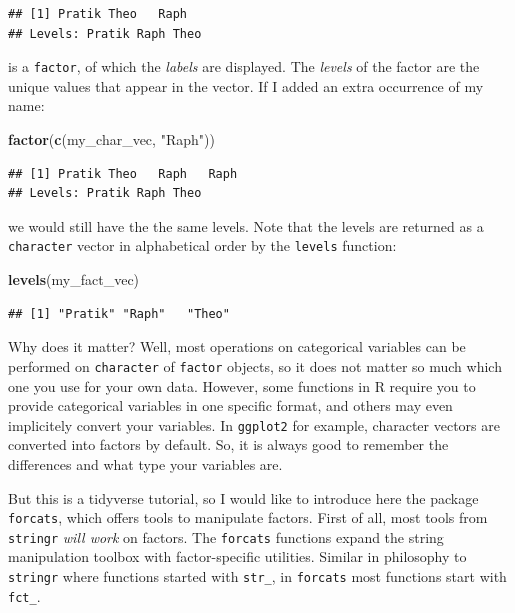 \documentclass[]{book}
\newenvironment{Shaded}{}{}
\newcommand{\KeywordTok}[1]{\textcolor[rgb]{0.00,0.44,0.13}{\textbf{#1}}}
\newcommand{\NormalTok}[1]{#1}
\newcommand{\StringTok}[1]{\textcolor[rgb]{0.25,0.44,0.63}{#1}}
\begin{document}
\begin{verbatim}
## [1] Pratik Theo   Raph  
## Levels: Pratik Raph Theo
\end{verbatim}

is a \texttt{factor}, of which the \emph{labels} are displayed. The \emph{levels} of the factor are the unique values that appear in the vector. If I added an extra occurrence of my name:

\begin{Shaded}
\begin{Highlighting}[]
\KeywordTok{factor}\NormalTok{(}\KeywordTok{c}\NormalTok{(my_char_vec, }\StringTok{"Raph"}\NormalTok{))}
\end{Highlighting}
\end{Shaded}

\begin{verbatim}
## [1] Pratik Theo   Raph   Raph  
## Levels: Pratik Raph Theo
\end{verbatim}

we would still have the the same levels. Note that the levels are returned as a \texttt{character} vector in alphabetical order by the \texttt{levels} function:

\begin{Shaded}
\begin{Highlighting}[]
\KeywordTok{levels}\NormalTok{(my_fact_vec)}
\end{Highlighting}
\end{Shaded}

\begin{verbatim}
## [1] "Pratik" "Raph"   "Theo"
\end{verbatim}

Why does it matter? Well, most operations on categorical variables can be performed on \texttt{character} of \texttt{factor} objects, so it does not matter so much which one you use for your own data. However, some functions in R require you to provide categorical variables in one specific format, and others may even implicitely convert your variables. In \texttt{ggplot2} for example, character vectors are converted into factors by default. So, it is always good to remember the differences and what type your variables are.

But this is a tidyverse tutorial, so I would like to introduce here the package \texttt{forcats}, which offers tools to manipulate factors. First of all, most tools from \texttt{stringr} \emph{will work} on factors. The \texttt{forcats} functions expand the string manipulation toolbox with factor-specific utilities. Similar in philosophy to \texttt{stringr} where functions started with \texttt{str\_}, in \texttt{forcats} most functions start with \texttt{fct\_}.
\end{document}
